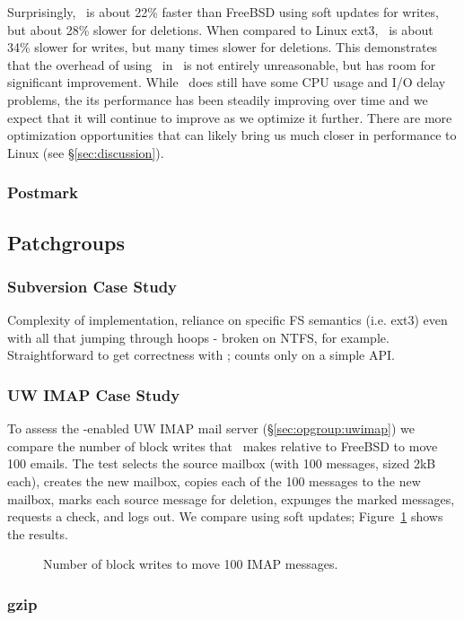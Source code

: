 Surprisingly, \Kudos\ is about 22\% faster than FreeBSD using soft updates for
writes, but about 28\% slower for deletions.
%
When compared to Linux ext3, \Kudos\ is about 34\% slower for writes, but many
times slower for deletions.
%
This demonstrates that the overhead of using \chdescs\ in \Kudos\ is not
entirely unreasonable, but has room for significant improvement.
%
While \Kudos\ does still have some CPU usage and I/O delay problems, the its
performance has been steadily improving over time and we expect that it will
continue to improve as we optimize it further.
%
There are more optimization opportunities that can likely bring us much closer
in performance to Linux (see \S\ref{sec:discussion}).

\subsubsection {Postmark}

\subsection {Patchgroups}

\subsubsection {Subversion Case Study}

Complexity of implementation, reliance on specific FS semantics (i.e. ext3)
even with all that jumping through hoops - broken on NTFS, for example.
Straightforward to get correctness with \opgroups; counts only on a simple API.

\subsubsection {UW IMAP Case Study}
\label{sec:evaluation:uwimap}
To assess the \opgroup-enabled UW IMAP mail server
(\S\ref{sec:opgroup:uwimap}) we compare the number of block writes
that \Kudos\ makes relative to FreeBSD to move 100 emails. The test
selects the source mailbox (with 100 messages, sized 2kB each),
creates the new mailbox, copies each of the 100 messages to the new
mailbox, marks each source message for deletion, expunges the marked
messages, requests a check, and logs out. We compare using soft updates;
Figure~\ref{fig:imap-compare} shows the results.

\begin{figure}[htb]
\caption{\label{fig:imap-compare} Number of block writes to move 100
  IMAP messages.}
\end{figure}

\subsubsection {gzip}
